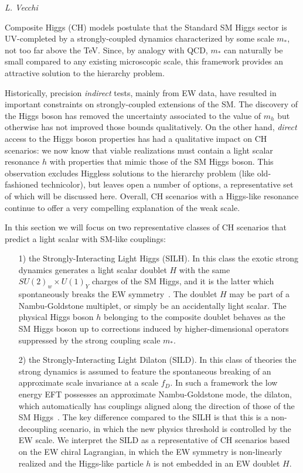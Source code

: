 \begin{center}
 {\it L. Vecchi}
\end{center}
\label{sec9:CHM}

Composite Higgs (CH) models postulate that the Standard SM Higgs sector is UV-completed by a strongly-coupled dynamics characterized by some scale $m_*$, not too far above the TeV. Since, by analogy with QCD, $m_*$ can naturally be small compared to any existing microscopic scale, this framework provides an attractive solution to the hierarchy problem. 

Historically, precision {\emph{indirect}} tests, mainly from EW data, have resulted in important constraints on strongly-coupled extensions of the SM. The discovery of the Higgs boson has removed the uncertainty associated to the value of $m_h$ but otherwise has not improved those bounds qualitatively. On the other hand, {\emph{direct}} access to the Higgs boson properties has had a qualitative impact on CH scenarios: we now know that viable realizations must contain a light scalar resonance $h$ with properties that mimic those of the SM Higgs boson. This observation excludes Higgless solutions to the hierarchy problem (like old-fashioned technicolor), but leaves open a number of options, a representative set of which will be discussed here. Overall, CH scenarios with a Higgs-like resonance continue to offer a very compelling explanation of the weak scale.




In this section we will focus on two representative classes of CH scenarios that predict a light scalar with SM-like couplings:
\begin{itemize}
\item[1)] the Strongly-Interacting Light Higgs (SILH). In this class the exotic strong dynamics generates a light scalar doublet $H$ with the same $SU(2)_w\times U(1)_Y$ charges of the SM Higgs, and it is the latter which spontaneously breaks the EW symmetry~\cite{Kaplan:1983fs, Kaplan:1983sm}. The doublet $H$ may be part of a Nambu-Goldstone multiplet, or simply be an accidentally light scalar. The physical Higgs boson $h$ belonging to the composite doublet behaves as the SM Higgs boson up to corrections induced by higher-dimensional operators suppressed by the strong coupling scale $m_*$. 
\item[2)] the Strongly-Interacting Light Dilaton (SILD). In this class of theories the strong dynamics is assumed to feature the spontaneous breaking of an approximate scale invariance at a scale $f_D$. In such a framework the low energy EFT possesses an approximate Nambu-Goldstone mode, the dilaton, which automatically has couplings aligned along the direction of those of the SM Higgs~\cite{Goldberger:2008zz}. The key difference compared to the SILH is that this is a non-decoupling scenario, in which the new physics threshold is controlled by the EW scale. We interpret the SILD as a representative of CH scenarios based on the EW chiral Lagrangian, in which the EW symmetry is non-linearly realized and the Higgs-like particle $h$ is not embedded in an EW doublet $H$. 
\end{itemize}



